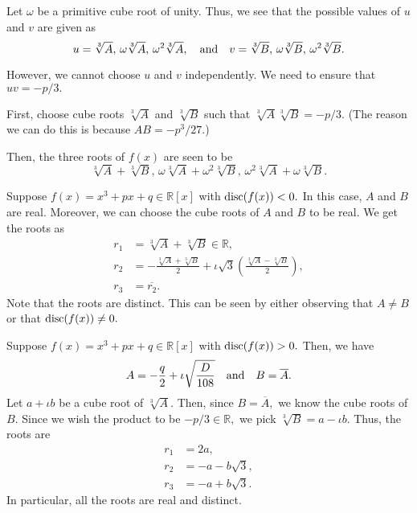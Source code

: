 Let $\omega$ be a primitive cube root of unity. Thus, we see that the possible values of $u$ and $v$ are given as
\begin{equation*} 
	u = \sqrt[3]{A},\, \omega\sqrt[3]{A},\, \omega^2\sqrt[3]{A}, \quad\text{and}\quad v = \sqrt[3]{B},\, \omega\sqrt[3]{B},\, \omega^2\sqrt[3]{B}.
\end{equation*}

However, we cannot choose $u$ and $v$ independently. We need to ensure that $uv = -p/3.$ 

First, choose cube roots $\sqrt[3]{A}$ and $\sqrt[3]{B}$ such that $\sqrt[3]{A}\sqrt[3]{B} = -p/3.$ (The reason we can do this is because $AB = -p^3/27.$)

Then, the three roots of $f(x)$ are seen to be 
\begin{equation*} 
	\sqrt[3]{A} + \sqrt[3]{B},\,\omega\sqrt[3]{A} + \omega^2\sqrt[3]{B},\,\omega^2\sqrt[3]{A} + \omega\sqrt[3]{B}.
\end{equation*}

\begin{ex}
	Suppose $f(x) = x^3 + px + q \in \mathbb{R}[x]$ with $\operatorname{disc}(f(x)) < 0.$ In this case, $A$ and $B$ are real. Moreover, we can choose the cube roots of $A$ and $B$ to be real. We get the roots as
	\begin{align*} 
		r_1 &= \sqrt[3]{A} + \sqrt[3]{B} \in \mathbb{R}, \\
		r_2 &= -\frac{\sqrt[3]{A} + \sqrt[3]{B}}{2} + \iota\sqrt{3}\left(\frac{\sqrt[3]{A} - \sqrt[3]{B}}{2}\right), \\
		r_3 &= \overline{r_2}.
	\end{align*}
	Note that the roots are distinct. This can be seen by either observing that $A \neq B$ or that $\operatorname{disc}(f(x)) \neq 0.$ 
\end{ex}

\begin{ex}
	Suppose $f(x) = x^3 + px + q \in \mathbb{R}[x]$ with $\operatorname{disc}(f(x)) > 0.$ Then, we have
	\begin{equation*} 
		A = -\frac{q}{2} + \iota\sqrt{\frac{D}{108}} \quad\text{and}\quad B = \overline{A}.
	\end{equation*}
	Let $a + \iota b$ be a cube root of $\sqrt[3]{A}.$ Then, since $B = \overline{A},$ we know the cube roots of $B.$ Since we wish the product to be $-p/3 \in \mathbb{R},$ we pick $\sqrt[3]{B} = a - \iota b.$ Thus, the roots are
	\begin{align*} 
		r_1 &= 2a, \\
		r_2 &= -a - b\sqrt{3}, \\
		r_3 &= -a + b\sqrt{3}.
	\end{align*}
	In particular, all the roots are real and distinct.
\end{ex}

